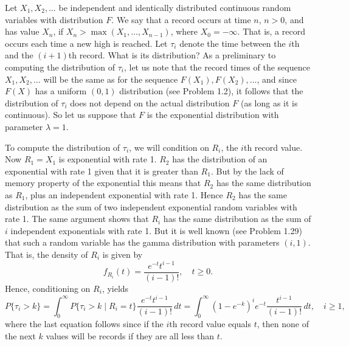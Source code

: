 \documentclass[lang=cn,10pt]{elegantbook}
\begin{document}
\begin{example}
	Let $X_1, X_2, \ldots$ be independent and identically distributed continuous random variables with distribution $F$. We say that a record occurs at time $n, \, n > 0$, and has value $X_n$, if $X_n > \max(X_1, \ldots, X_{n-1})$, where $X_0 = -\infty$. That is, a record occurs each time a new high is reached. Let $\tau_i$ denote the time between the $i$th and the $(i + 1)$th record. What is its distribution?
As a preliminary to computing the distribution of $\tau_i$, let us note that the record times of the sequence $X_1, X_2, \ldots$ will be the same as for the sequence $F(X_1), F(X_2), \ldots$, and since $F(X)$ has a uniform $(0, 1)$ distribution (see Problem 1.2), it follows that the distribution of $\tau_i$ does not depend on the actual distribution $F$ (as long as it is continuous). So let us suppose that $F$ is the exponential distribution with parameter $\lambda = 1$.

To compute the distribution of $\tau_i$, we will condition on $R_i$, the $i$th record value. Now $R_1 = X_1$ is exponential with rate 1. $R_2$ has the distribution of an exponential with rate 1 given that it is greater than $R_1$. But by the lack of memory property of the exponential this means that $R_2$ has the same distribution as $R_1$, plus an independent exponential with rate 1. Hence $R_2$ has the same distribution as the sum of two independent exponential random variables with rate 1. The same argument shows that $R_i$ has the same distribution as the sum of $i$ independent exponentials with rate 1. But it is well known (see Problem 1.29) that such a random variable has the gamma distribution with parameters $(i, 1)$. That is, the density of $R_i$ is given by
\[
f_{R_i}(t) = \frac{e^{-t} t^{i-1}}{(i-1)!}, \quad t \geq 0.
\]
Hence, conditioning on $R_i$, yields
\[
P\{\tau_i > k\} = \int_{0}^{\infty} P\{\tau_i > k \mid R_i = t\} \frac{e^{-t} t^{i-1}}{(i-1)!} \, dt = \int_{0}^{\infty} (1 - e^{-k})^i e^{-t} \frac{t^{i-1}}{(i-1)!} \, dt, \quad i \geq 1,
\]
where the last equation follows since if the $i$th record value equals $t$, then none of the next $k$ values will be records if they are all less than $t$.


\end{example}
\end{document}
